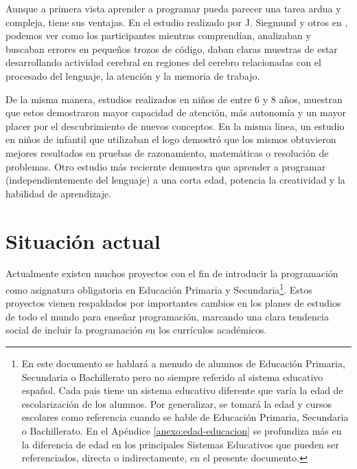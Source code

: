 Aunque a primera vista aprender a programar pueda parecer una tarea ardua y compleja, tiene sus ventajas. En el estudio realizado por J. Siegmund y otros en \cite{siegmund2014understanding}, podemos ver como los participantes mientras comprendían, analizaban y buscaban errores en pequeños trozos de código, daban claras muestras de estar desarrollando actividad cerebral en regiones del cerebro relacionadas con el procesado del lenguaje, la atención y la memoria de trabajo.

De la misma manera, estudios realizados en niños \cite{clements1986effects} de entre 6 y 8 años, muestran que estos demostraron mayor capacidad de atención, más autonomía y un mayor placer por el descubrimiento de nuevos conceptos. En la misma linea, un estudio en niños de infantil \cite{logo-geometry} que utilizaban el \Gls{logo} demostró que los mismos obtuvieron mejores resultados en pruebas de razonamiento, matemáticas o resolución de problemas. Otro estudio más reciernte \cite{liao1991effects} demuestra que aprender a programar (independientemente del lenguaje) a una corta edad, potencia la creatividad y la habilidad de aprendizaje.



\section{Situación actual}
\label{sec:situacion-actual}


Actualmente existen muchos proyectos con el fin de introducir la programación como asignatura obligatoria en Educación Primaria y Secundaria\footnote{En este documento se hablará a menudo de alumnos de Educación Primaria, Secundaria o Bachillerato pero no siempre referido al sistema educativo español. Cada pais tiene un sistema educativo diferente que varía la edad de escolarización de los alumnos. Por generalizar, se tomará la edad y cursos escolares como referencia cuando se hable de Educación Primaria, Secundaria o Bachillerato. En el Apéndice \ref{anexo:edad-educacion} se profundiza más en la diferencia de edad en los principales Sistemas Educativos que pueden ser referenciados, directa o indirectamente, en el presente documento.}. Estos proyectos vienen respaldados por importantes cambios en los planes de estudios de todo el mundo para enseñar programación\cite{cs-education,madrid-programacion,codigo21, guide-england-computing,chicago-cs}, marcando una clara tendencia social de incluir la programación en los currículos académicos.



